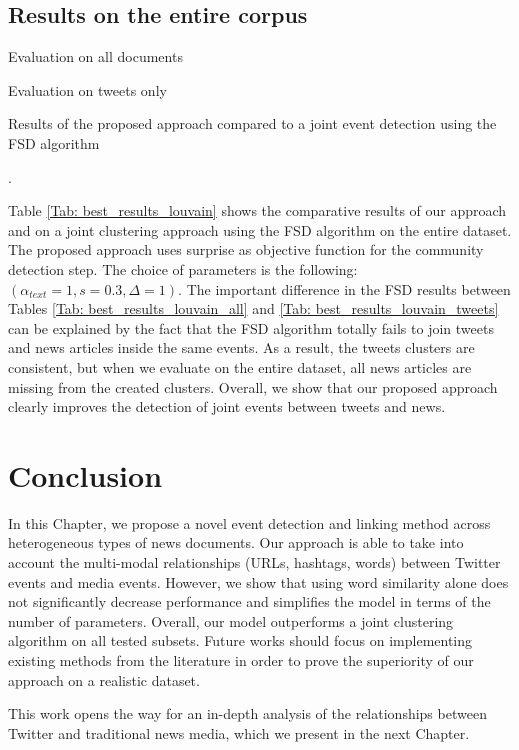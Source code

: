 \subsection{Results on the entire corpus}
\label{Joint_results}
\begin{table}[h]
\centering
\begin{subtable}{.5\textwidth}
  \centering
  
  \caption{Evaluation on all documents}
  \label{Tab: best_results_louvain_all}
\end{subtable}%
\begin{subtable}{.5\textwidth}
  \centering
  
  \caption{Evaluation on tweets only}
  \label{Tab: best_results_louvain_tweets}
\end{subtable}
\caption{Results of the proposed approach compared to a joint event detection using the FSD algorithm}.
\label{Tab: best_results_louvain}
\end{table}
Table \ref{Tab: best_results_louvain} shows the comparative results of our approach and on a joint clustering approach using the FSD algorithm on the entire dataset. The proposed approach uses surprise as objective function for the community detection step. The choice of parameters is the following: $(\alpha_{text}=1, s=0.3, \Delta=1)$. The important difference in the FSD results between Tables \ref{Tab: best_results_louvain_all} and \ref{Tab: best_results_louvain_tweets} can be explained by the fact that the FSD algorithm totally fails to join tweets and news articles inside the same events. As a result, the tweets clusters are consistent, but when we evaluate on the entire dataset, all news articles are missing from the created clusters. Overall, we show that our proposed approach clearly improves the detection of joint events between tweets and news.


\section{Conclusion}
In this Chapter, we propose a novel event detection and linking method across heterogeneous types of news documents. Our approach is able to take into account the multi-modal relationships (URLs, hashtags, words) between Twitter events and media events. However, we show that using word similarity alone does not significantly decrease performance and simplifies the model in terms of the number of parameters. Overall, our model outperforms a joint clustering algorithm on all tested subsets. Future works should focus on implementing existing methods from the literature \citep{mele_linking_2017, hua_topical_2016} in order to prove the superiority of our approach on a realistic dataset.

This work opens the way for an in-depth analysis of the relationships between Twitter and traditional news media, which we present in the next Chapter.